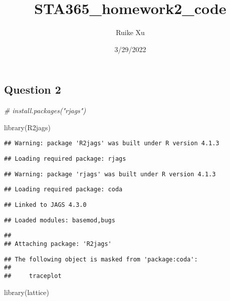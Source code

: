 \documentclass[
]{article}
\title{STA365\_homework2\_code}
\author{Ruike Xu}
\date{3/29/2022}
\newenvironment{Shaded}{\begin{snugshade}}{\end{snugshade}}
\newcommand{\CommentTok}[1]{\textcolor[rgb]{0.56,0.35,0.01}{\textit{#1}}}
\newcommand{\FunctionTok}[1]{\textcolor[rgb]{0.00,0.00,0.00}{#1}}
\newcommand{\NormalTok}[1]{#1}
\begin{document}
\maketitle

\hypertarget{question-2}{%
\subsection{Question 2}\label{question-2}}

\begin{Shaded}
\begin{Highlighting}[]
\CommentTok{\# install.packages("rjags")}

\FunctionTok{library}\NormalTok{(R2jags)}
\end{Highlighting}
\end{Shaded}

\begin{verbatim}
## Warning: package 'R2jags' was built under R version 4.1.3
\end{verbatim}

\begin{verbatim}
## Loading required package: rjags
\end{verbatim}

\begin{verbatim}
## Warning: package 'rjags' was built under R version 4.1.3
\end{verbatim}

\begin{verbatim}
## Loading required package: coda
\end{verbatim}

\begin{verbatim}
## Linked to JAGS 4.3.0
\end{verbatim}

\begin{verbatim}
## Loaded modules: basemod,bugs
\end{verbatim}

\begin{verbatim}
## 
## Attaching package: 'R2jags'
\end{verbatim}

\begin{verbatim}
## The following object is masked from 'package:coda':
## 
##     traceplot
\end{verbatim}

\begin{Shaded}
\begin{Highlighting}[]
\FunctionTok{library}\NormalTok{(lattice)}
\end{Highlighting}
\end{Shaded}
\end{document}
